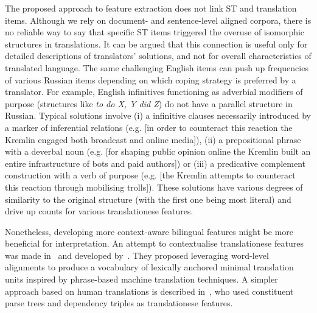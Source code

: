 The proposed approach to feature extraction does not link ST and translation items. Although we rely on document- and sentence-level aligned corpora, there is no reliable way to say that specific ST items triggered the overuse of isomorphic structures in translations. It can be argued that this connection is useful only for detailed descriptions of translators' solutions, and not for overall characteristics of translated language. The same challenging English items can push up frequencies of various Russian items depending on which coping strategy is preferred by a translator. For example, English infinitives functioning as adverbial modifiers of purpose (structures like \textit{to do X, Y did Z}) do not have a parallel structure in Russian. Typical solutions involve (i) a infinitive clauses necessarily introduced by a marker of inferential relations (e.g.  [in order to counteract this reaction the Kremlin engaged both broadcast and online media]), (ii) a prepositional phrase with a deverbal noun (e.g.   [for shaping public opinion online the Kremlin built an entire infrastructure of bots and paid authors]) or (iii) a predicative complement construction with a verb of purpose (e.g.  [the Kremlin attempts to counteract this reaction through mobilising trolls]). These solutions have various degrees of similarity to the original structure (with the first one being most literal) and drive up counts for various translationese features. 

Nonetheless, developing more context-aware bilingual features might be more beneficial for interpretation.
An attempt to contextualise translationese features was made in~\citet{Eetemadi2015} and developed by~\citet{Sominsky2019}. They proposed leveraging word-level alignments to produce a vocabulary of lexically anchored minimal translation units inspired by phrase-based machine translation techniques. A simpler approach based on human translations is described in~\citet{Hu2018}, who used constituent parse trees and dependency triples as translationese features.


